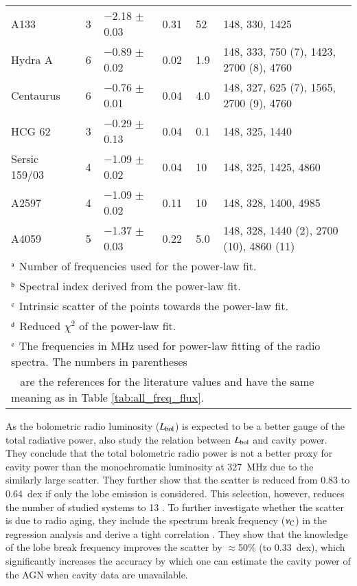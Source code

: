 \documentclass{aa}  %
\begin{document}
\begin{table*}[ht]
\begin{center}
\begin{tabular}{l l l l l l}
		
		A133						& 3			&	$-$2.18 $\pm$ 0.03	&	0.31	&	52		&					148, 330, 1425 \\
		Hydra A					& 6			&	$-$0.89 $\pm$ 0.02	&	0.02	&	1.9	&					148, 333, 750 (7), 1423, 2700 (8), 4760\\
		Centaurus				& 6			&	$-$0.76 $\pm$ 0.01	&	0.04	&	4.0	&					148, 327, 625 (7), 1565, 2700 (9), 4760\\
		HCG 62					& 3			&	$-$0.29 $\pm$ 0.13	&	0.04	&	0.1	&					148, 325, 1440\\
		Sersic 159/03			& 4			&	$-$1.09 $\pm$ 0.02	&	0.04	&	10		&					148, 325, 1425, 4860\\
		A2597					& 4			&	$-$1.09 $\pm$ 0.02	&	0.11	&	10		&					148, 328, 1400, 4985\\
		A4059					& 5			&	$-$1.37 $\pm$ 0.03	&	0.22	&	5.0	&					148, 328, 1440 (2), 2700 (10), 4860 (11)\\
		\hline
		\multicolumn{6}{l}{$\rm{^a}$ Number of frequencies used for the power-law fit.} \\	
		\multicolumn{6}{l}{$\rm{^b}$ Spectral index derived from the power-law fit.} \\	
		\multicolumn{6}{l}{$\rm{^c}$ Intrinsic scatter of the points towards the power-law fit.} \\
		\multicolumn{6}{l}{$\rm{^d}$ Reduced $\chi^2$ of the power-law fit.} \\	
		\multicolumn{6}{l}{$\rm{^e}$ The frequencies in MHz used for power-law fitting of the radio spectra. The numbers in parentheses } \\	
		\multicolumn{6}{l}{\,\,\,  are the references for the literature values and have the same meaning as in Table \ref{tab:all_freq_flux}. } \\	
	\end{tabular}
	\label{tab:fitting_L_bol}
	\end{center}
\end{table*}



As the bolometric radio luminosity ($L_{\rm{bol}}$) is expected to be a better gauge of the total radiative power, \cite{Birzan2008} also study the relation between $L_{\rm{bol}}$ and cavity power.
They conclude that the total bolometric radio power is not a better proxy for cavity power than the monochromatic luminosity at 327~MHz due to the similarly large scatter.
They further show that the scatter is reduced from 0.83 to 0.64~dex if only the lobe emission is considered.  
This selection, however, reduces the number of studied systems to 13 \citep[Table 3][]{Birzan2008}.
To further investigate whether the scatter is due to radio aging, they include the spectrum break frequency ($\nu_{\rm{C}}$) in the regression analysis and derive a tight correlation \cite[Equation 17;][]{Birzan2008}.
They show that the knowledge of the lobe break frequency improves the scatter by $\approx$50\% (to 0.33~dex), which significantly increases the accuracy by which one can estimate the cavity power of the AGN when cavity data are unavailable.
\end{document}
